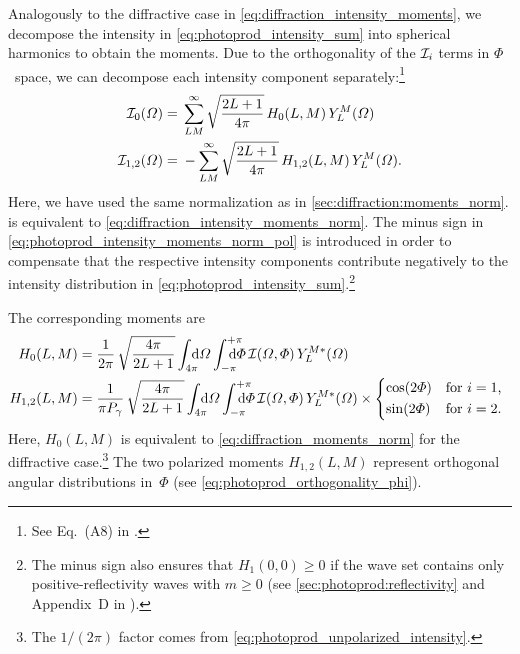 Analogously to the diffractive case in
\cref{eq:diffraction_intensity_moments}, we decompose the intensity in
\cref{eq:photoprod_intensity_sum} into spherical harmonics to obtain
the moments.  Due to the orthogonality of the $\mathcal{I}_i$ terms in
$\Phi$~space, we can decompose each intensity component
separately:\footnote{See Eq.~(A8) in .}
\begin{align}
  \label{eq:photoprod_intensity_moments_norm_unpol}
  \mathcal{I}_0(\Omega)
  ={}& \sum_{L M}^\infty \sqrt{\frac{2 L + 1}{4 \pi}}\, H_0(L, M)\, Y_L^M(\Omega)
  \\
  \label{eq:photoprod_intensity_moments_norm_pol}
  \mathcal{I}_{1, 2}(\Omega)
  ={}& -\sum_{L M}^\infty \sqrt{\frac{2 L + 1}{4 \pi}}\, H_{1, 2}(L, M)\, Y_L^M(\Omega).
\end{align}
Here, we have used the same normalization as in
\cref{sec:diffraction:moments_norm}.
 is equivalent to
\cref{eq:diffraction_intensity_moments_norm}.  The minus sign in
\cref{eq:photoprod_intensity_moments_norm_pol} is introduced in order
to compensate that the respective intensity components contribute
negatively to the intensity distribution in
\cref{eq:photoprod_intensity_sum}.\footnote{\label{fn:photoprod_intensity_sign}The
minus sign also ensures that $H_1(0, 0) \geq 0$ if the wave set
contains only positive-reflectivity waves with $m \geq 0$ (see
\cref{sec:photoprod:reflectivity} and Appendix~D in
).}

The corresponding moments are
\begin{align}
  \label{eq:photoprod_moment_norm_unpol}
  H_0(L, M)
  ={}& \frac{1}{2 \pi}\, \sqrt{\frac{4 \pi}{2 L + 1}} \int_{4 \pi}\!\!\!\! \dif{\Omega} \int_{-\pi}^{+\pi}\hspace{-1.2em} \dif{\Phi}\,
  \intensity(\Omega, \Phi)\, Y_L^{M *}(\Omega)
  \\
  \label{eq:photoprod_moments_norm_pol}
  H_{1, 2}(L, M)
  ={}& \frac{1}{\pi P_\gamma}\, \sqrt{\frac{4 \pi}{2 L + 1}} \int_{4 \pi}\!\!\!\! \dif{\Omega} \int_{-\pi}^{+\pi}\hspace{-1.2em} \dif{\Phi}\,
  \intensity(\Omega, \Phi)\, Y_L^{M *}(\Omega) \times \begin{cases*}
    \cos(2 \Phi) & for $i = 1$, \\
    \sin(2 \Phi) & for $i = 2$.
  \end{cases*}
\end{align}
Here, $H_0(L, M)$ is equivalent to \cref{eq:diffraction_moments_norm}
for the diffractive case.\footnote{The $1 / (2 \pi)$ factor comes from
\cref{eq:photoprod_unpolarized_intensity}.}  The two polarized moments
$H_{1, 2}(L, M)$ represent orthogonal angular distributions in~$\Phi$
(see \cref{eq:photoprod_orthogonality_phi}).


